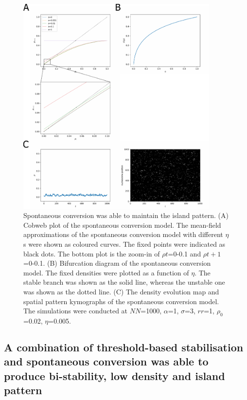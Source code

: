 \begin{figure}[htbp]
  \centering
  \includegraphics[width=0.9\textwidth]{chapter2/figures/spontaneous_conversion.pdf}
  \caption[Spontaneous conversion was able to maintain the island pattern]{Spontaneous conversion was able to maintain the island pattern. (A) Cobweb plot of the spontaneous conversion model. The mean-field approximations of the spontaneous conversion model with different $\eta$s were shown as coloured curves. The fixed points were indicated as black dots. The bottom plot is the zoom-in of $\rho{t}$=0-0.1 and $\rho{t+1}$=0-0.1. (B) Bifurcation diagram of the spontaneous conversion model. The fixed densities were plotted as a function of $\eta$. The stable branch was shown as the solid line, whereas the unstable one was shown as the dotted line. (C) The density evolution map and spatial pattern kymographs of the spontaneous conversion model. The simulations were conducted at $NN$=1000, $\alpha$=1, $\sigma$=3, $rr$=1, $\rho_{0}$=0.02, $\eta$=0.005.}
  \label{fig:spontaneousConversion}
\end{figure}

\subsection{A combination of threshold-based stabilisation and spontaneous conversion was able to produce bi-stability, low density and island pattern}


